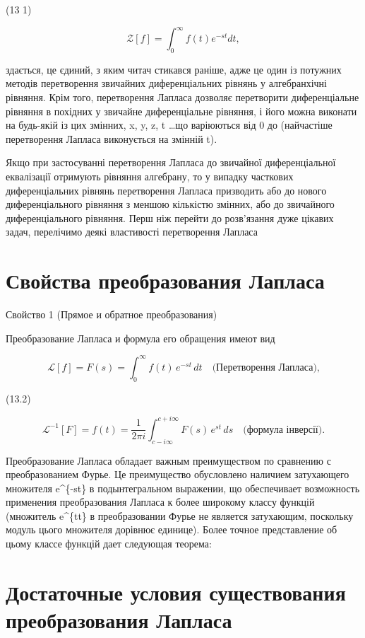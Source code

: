 \documentclass[
  ukrainian,
]{article}
\begin{document}
(13 1)

\[
\mathscr{Z}[f] = \int_{0}^{\infty} f(t) e^{-st} dt,
\]

здається, це єдиний, з яким читач стикався раніше, адже це один із
потужних методів перетворення звичайних диференціальних рівнянь у
алгебранхічні рівняння. Крім того, перетворення Лапласа дозволяє
перетворити диференціальне рівняння в похідних у звичайне диференціальне
рівняння, і його можна виконати на будь-якій із цих змінних, x, y, z, t
\ldots що варіюються від 0 до \infty (найчастіше перетворення Лапласа
виконується на змінній t).

Якщо при застосуванні перетворення Лапласа до звичайної диференціальної
еквалізації отримують рівняння алгебрану, то у випадку часткових
диференціальних рівнянь перетворення Лапласа призводить або до нового
диференціального рівняння з меншою кількістю змінних, або до звичайного
диференціального рівняння. Перш ніж перейти до розв'язання дуже цікавих
задач, перелічимо деякі властивості перетворення Лапласа

\section{Свойства преобразования
Лапласа}\label{ux441ux432ux43eux439ux441ux442ux432ux430-ux43fux440ux435ux43eux431ux440ux430ux437ux43eux432ux430ux43dux438ux44f-ux43bux430ux43fux43bux430ux441ux430}

Свойство 1 (Прямое и обратное преобразования)

Преобразование Лапласа и формула его обращения имеют вид

\[
\mathscr{L}[f] = F(s) = \int_{0}^{\infty} f(t) \, e^{-st} \, dt \quad \text{(Перетворення Лапласа),}
\]

(13.2)

\[
\mathscr{L}^{-1}[F] = f(t) = \frac{1}{2\pi i} \int_{c-i\infty}^{c+i\infty} F(s) \, e^{st} \, ds \quad \text{(формула інверсії).}
\]

Преобразование Лапласа обладает важным преимуществом по сравнению с
преобразованием Фурье. Це преимущество обусловлено наличием затухающего
множителя e\^{}\{-st\} в подынтегральном выражении, що обеспечивает
возможность применения преобразования Лапласа к более широкому классу
функцій (множитель e\^{}\{t\xi t\} в преобразовании Фурье не является
затухающим, поскольку модуль цього множителя дорівнює единице). Более
точное представление об цьому классе функцій дает следующая теорема:

\section{Достаточные условия существования преобразования
Лапласа}\label{ux434ux43eux441ux442ux430ux442ux43eux447ux43dux44bux435-ux443ux441ux43bux43eux432ux438ux44f-ux441ux443ux449ux435ux441ux442ux432ux43eux432ux430ux43dux438ux44f-ux43fux440ux435ux43eux431ux440ux430ux437ux43eux432ux430ux43dux438ux44f-ux43bux430ux43fux43bux430ux441ux430}
\end{document}
